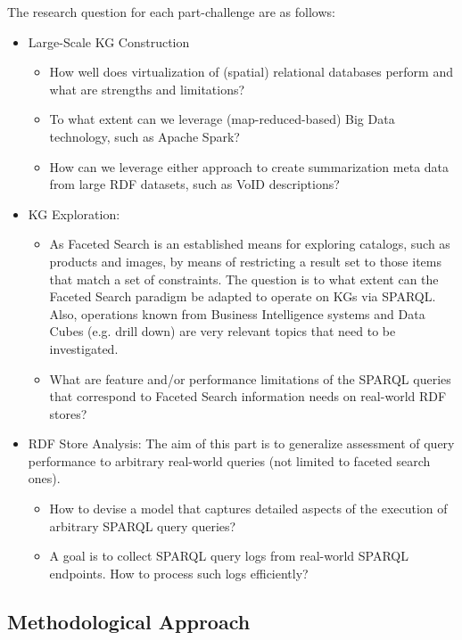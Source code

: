 The research question for each part-challenge are as follows:

\begin{itemize}
\item Large-Scale KG Construction
  \begin{itemize}
    \item How well does virtualization of (spatial) relational databases perform and what are strengths and limitations?
    \item To what extent can we leverage (map-reduced-based) Big Data technology, such as Apache Spark?
    \item How can we leverage either approach to create summarization meta data from large RDF datasets, such as VoID descriptions?
  \end{itemize}
\item KG Exploration:
  \begin{itemize}
  \item As Faceted Search is an established means for exploring catalogs, such as products and images, by means of restricting a result set to those items that match a set of constraints. The question is to what extent can the Faceted Search paradigm be adapted to operate on KGs via SPARQL.  Also, operations known from Business Intelligence systems and Data Cubes (e.g. drill down) are very relevant topics that need to be investigated.
  \item What are feature and/or performance limitations of the SPARQL queries that correspond to Faceted Search information needs on real-world RDF stores?
  \end{itemize}
\item RDF Store Analysis: The aim of this part is to generalize assessment of query performance to arbitrary real-world queries (not limited to faceted search ones).
  \begin{itemize}
  \item How to devise a model that captures detailed aspects of the execution of arbitrary SPARQL query queries?
  \item A goal is to collect SPARQL query logs from real-world SPARQL endpoints. How to process such logs efficiently?
  \end{itemize}
\end{itemize}

\subsection{Methodological Approach}

